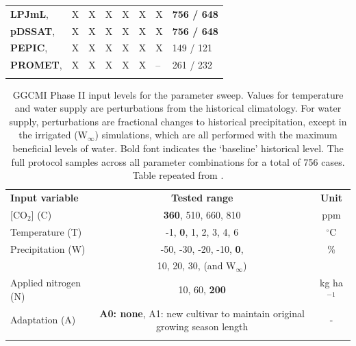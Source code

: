 \documentclass[gmd, manuscript]{copernicus} %
\begin{document}
\begin{table}[ht]
\begin{tabular}{p{6cm} p{1cm} p{1cm} p{1cm} p{1cm} p{1cm} p{1cm} p{1.9cm}}
        \textbf{LPJmL},     \citet{von_Bloh_implementing_2018} & X & X & X & X & X & X & \textbf{756 / 648}\\ \middlehline
        \textbf{pDSSAT},    \citet{Elliott2014b, JONES2003235} & X & X & X & X & X & X & \textbf{756 / 648}\\ \middlehline
        \textbf{PEPIC},     \citet{LIU2016164, LIU2016}        & X & X & X & X & X & X & 149 / 121\\ \middlehline
        \textbf{PROMET},    \citet{Hank2015, MAUSER2015, Zabel2019}  & X & X & X & X & X & -- & 261 / 232\\
        \bottomhline
    \end{tabular}
\end{table}

\begin{table}[ht]
    \caption{
    GGCMI Phase II input levels for the parameter sweep. 
    Values for temperature and water supply are perturbations from the historical climatology. 
    For water supply, perturbations are fractional changes to historical precipitation, except in the irrigated (W$_{\infty}$) simulations, which are all performed with the maximum beneficial levels of water. 
    Bold font indicates the `baseline' historical level. 
    The full protocol samples across all parameter combinations for a total of 756 cases.
    Table repeated from \citet{franke2019ctwnexperiment}.
    }
    \label{table:inputs} 
    \begin{tabular}{lcc} 
        \tophline \vspace{1mm}
        \textbf{Input variable} & \textbf{Tested range} & \textbf{Unit} \\ \middlehline \vspace{1mm}
        [CO$_2$] (C) & \textbf{360}, 510, 660, 810 & ppm\\ \middlehline \vspace{1mm}
        Temperature (T) & -1, \textbf{0}, 1, 2, 3, 4, 6 & $^{\circ}$C\\ \middlehline \vspace{1mm}
        Precipitation (W) & -50, -30, -20, -10, \textbf{0}, & \% \\
        {} & 10, 20, 30, (and W$_{\infty}$) & {} \\ \middlehline \vspace{1mm}
        Applied nitrogen (N) & 10, 60, \textbf{200} & kg ha$^{-1}$ \\ \middlehline \vspace{1mm}
        Adaptation (A) & \textbf{A0: none}, A1: new cultivar to maintain original growing season length & -\\ \bottomhline
    \end{tabular}\\
\end{table}
\end{document}
